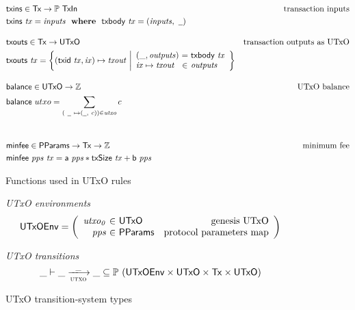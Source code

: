 \begin{figure}
  \begin{align*}
    & \fun{txins} \in \Tx \to \powerset{\TxIn}
    & \text{transaction inputs} \\
    & \txins{tx} = \var{inputs} \where \txbody{tx} = (\var{inputs}, ~\wcard)
    \nextdef
    & \fun{txouts} \in \Tx \to \UTxO
    & \text{transaction outputs as UTxO} \\
    & \fun{txouts} ~ \var{tx} =
      \left\{ (\fun{txid} ~ \var{tx}, \var{ix}) \mapsto \var{txout} ~
      \middle| \begin{array}{l@{~}c@{~}l}
                 (\_, \var{outputs}) & = & \txbody{tx} \\
                 \var{ix} \mapsto \var{txout} & \in & \var{outputs}
               \end{array}
      \right\}
    \nextdef
    & \fun{balance} \in \UTxO \to \mathbb{Z}
    & \text{UTxO balance} \\
    & \fun{balance} ~ utxo = \sum_{(~\wcard ~ \mapsto (\wcard, ~c)) \in \var{utxo}} c\\
   \nextdef
    & \fun{minfee} \in \PPMMap \to \Tx \to \mathbb{Z} & \text{minimum fee}\\
    & \fun{minfee}~\var{pps}~\var{tx} =
      \fun{a}~\var{pps} * \fun{txSize}~\var{tx} + \fun{b}~\var{pps}
  \end{align*}
  \caption{Functions used in UTxO rules}
  \label{fig:derived-defs:utxo}
\end{figure}

\begin{figure}
  \emph{UTxO environments}
  \begin{equation*}
    \UTxOEnv =
    \left(
      \begin{array}{r@{~\in~}lr}
        \var{utxo_0} & \UTxO & \text{genesis UTxO}\\
        \var{pps} & \PPMMap & \text{protocol parameters map}\\
      \end{array}
    \right)
  \end{equation*}

  \emph{UTxO transitions}
  \begin{equation*}
    \_ \vdash
    \var{\_} \trans{utxo}{\_} \var{\_}
    \subseteq \powerset (\UTxOEnv \times \UTxO \times \Tx \times \UTxO)
  \end{equation*}
  \caption{UTxO transition-system types}
  \label{fig:ts-types:utxo}
\end{figure}

